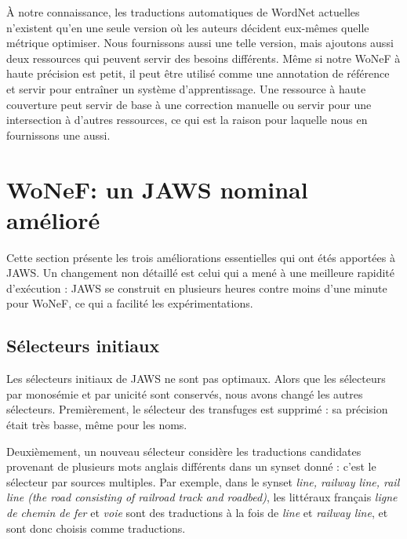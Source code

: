 À notre connaissance, les traductions automatiques de WordNet actuelles n'existent qu'en une seule version où les auteurs décident eux-mêmes quelle métrique optimiser. Nous fournissons aussi une telle version, mais ajoutons aussi deux ressources qui peuvent servir des besoins différents. Même si notre WoNeF à haute précision est petit, il peut être utilisé comme une annotation de référence et servir pour entraîner un système d'apprentissage. Une ressource à haute couverture peut servir de base à une correction manuelle ou servir pour une intersection à d'autres ressources, ce qui est la raison pour laquelle nous en fournissons une aussi.

\section{WoNeF: un JAWS nominal amélioré}
\label{sec:improving_jaws}

Cette section présente les trois améliorations essentielles qui ont étés apportées à JAWS. Un changement non détaillé est celui qui a mené à une meilleure rapidité d'exécution : JAWS se construit en plusieurs heures contre moins d'une minute pour WoNeF, ce qui a facilité les expérimentations.

\subsection{Sélecteurs initiaux}
\label{subsec:revisiting_extraction_heuristics}


Les sélecteurs initiaux de JAWS ne sont pas optimaux. Alors que les sélecteurs par monosémie et par unicité sont conservés, nous avons changé les autres sélecteurs. Premièrement, le sélecteur des transfuges est supprimé : sa précision était très basse, même pour les noms.

Deuxièmement, un nouveau sélecteur considère les traductions candidates provenant de plusieurs mots anglais différents dans un synset donné : c'est le sélecteur par sources multiples. Par exemple, dans le synset \textit{line, railway line, rail line (the road consisting of railroad track and roadbed)}, les littéraux français \textit{ligne de chemin de fer} et \textit{voie} sont des traductions à la fois de \textit{line} et \textit{railway line}, et sont donc choisis comme traductions.

